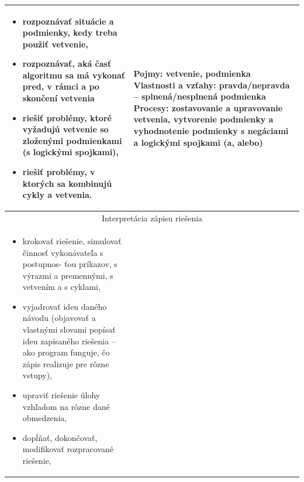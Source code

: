 \documentclass[FP,DP]{tulthesis}
\begin{document}
{{{{{{\begin{table}[t]
\begin{tabular}{|l|l|}
\begin{minipage}[t]{0.45\textwidth}
\begin{itemize}[leftmargin=*,nosep]
  	\item rozpoznávať situácie a podmienky, kedy treba použiť vetvenie,
	\item rozpoznávať, aká časť algoritmu sa má vykonať pred, v rámci
a po skončení vetvenia
\item riešiť problémy, ktoré vyžadujú vetvenie so zloženými podmienkami
(s logickými spojkami),
\item riešiť problémy, v ktorých sa kombinujú cykly a vetvenia.
\end{itemize}
  \end{minipage} &
  \begin{minipage}[t]{0.45\textwidth}
Pojmy: vetvenie, podmienka
Vlastnosti a vzťahy: pravda/nepravda – splnená/nesplnená podmienka
Procesy: zostavovanie a upravovanie vetvenia, vytvorenie podmienky
a vyhodnotenie podmienky s negáciami a logickými spojkami (a, alebo)
  \end{minipage}\\\hline
\multicolumn{2}{|c|}{Interpretácia zápisu riešenia}\\\hline
\begin{minipage}[t]{0.45\textwidth}
\begin{itemize}[leftmargin=*,nosep]
  	\item krokovať riešenie, simulovať činnosť vykonávateľa s postupnos-
ťou príkazov, s výrazmi a premennými, s vetvením a s cyklami,
	\item vyjadrovať ideu daného návodu (objavovať a vlastnými slovami
popísať ideu zapísaného riešenia – ako program funguje, čo zápis
realizuje pre rôzne vstupy),
\item upraviť riešenie úlohy vzhľadom na rôzne dané obmedzenia,
\item dopĺňať, dokončovať, modifikovať rozpracované riešenie,


\end{itemize}
\end{minipage}
\end{tabular}
\end{table}}}}}}}
\end{document}
